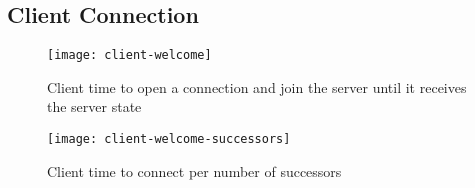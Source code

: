 \subsection{Client Connection}
\label{sub:eval:connection}


\begin{figure}
    \centering
    \texttt{[image: client-welcome]}
    \caption{Client time to open a connection and join the server until it receives the server state}
    \label{fig:client-welcome}
\end{figure}


\begin{figure}
    \centering
    \texttt{[image: client-welcome-successors]}
    \caption{Client time to connect per number of successors}
    \label{fig:client-welcome-successors}
\end{figure}